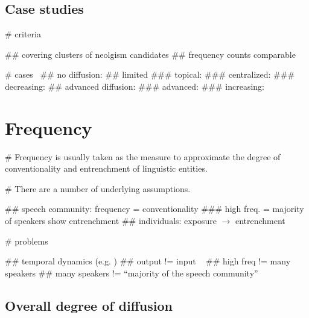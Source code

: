 \documentclass[
  a4paper,
  ]{scrartcl}
\begin{document}
  \subsection{Case studies}

    \begin{easylist}[itemize]

      # criteria

        ## covering clusters of neolgism candidates
        ## frequency counts comparable

      # cases~\parencite{Kerremans2015}
        ## no diffusion: 
        ## limited
          ### topical: 
          ### centralized: 
          ### decreasing: 
        ## advanced diffusion:
          ### advanced: 
          ### increasing: 

    \end{easylist}

\section{Frequency}

  \begin{easylist}[itemize]

    # Frequency is usually taken as the measure to approximate the degree of conventionality and entrenchment of linguistic entities.

    # There are a number of underlying assumptions.

      ## speech community: frequency = conventionality
        ### high freq. = majority of speakers show entrenchment
      ## individuals: exposure $\rightarrow$ entrenchment

    # problems

      ## temporal dynamics (e.g. )
      ## output != input ~\parencite{Stefanowitsch2017}
      ## high freq != many speakers
      ## many speakers != \enquote{majority of the speech community}

  \end{easylist}

  \subsection{Overall degree of diffusion}
\end{document}
